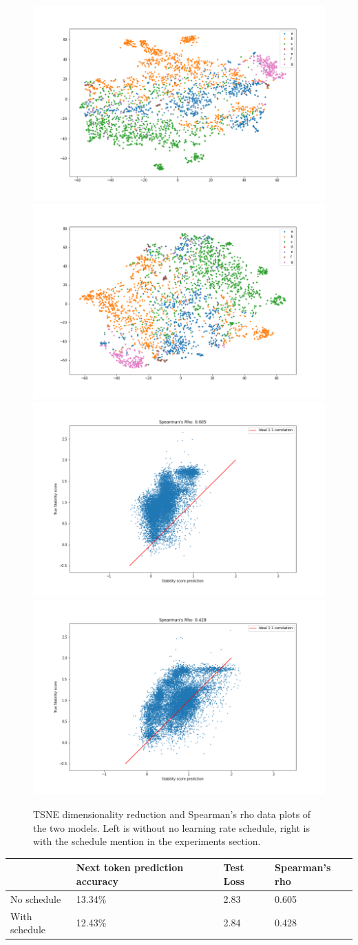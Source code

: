 \begin{figure}[!ht]
  \centering
  \includegraphics[width=0.49\linewidth]{latex/imgs/tsne_1_layer_no_schedule_512_final.png}
  \includegraphics[width=0.49\linewidth]{latex/imgs/tsne_1_layer_with_schedule_512_final.png}
  \includegraphics[width=0.49\linewidth]{latex/imgs/spearman_1_layer_no_schedule_512_final.png}
  \includegraphics[width=0.49\linewidth]{latex/imgs/spearman_1_layer_with_schedule_512_final.png}
  \caption{TSNE dimensionality reduction  and Spearman's rho data plots of the two models. Left is without no learning rate schedule, right is with the schedule mention in the experiments section.}
\end{figure}

\begin{table}[!ht]
\begin{tabular}{|l|l|l|l|}
\hline
              & Next token prediction accuracy & Test Loss & Spearman's rho\\ \hline
No schedule   & 13.34\%                        & 2.83      & 0.605         \\ \hline
With schedule & 12.43\%                        & 2.84      & 0.428         \\ \hline
\end{tabular}
\end{table}